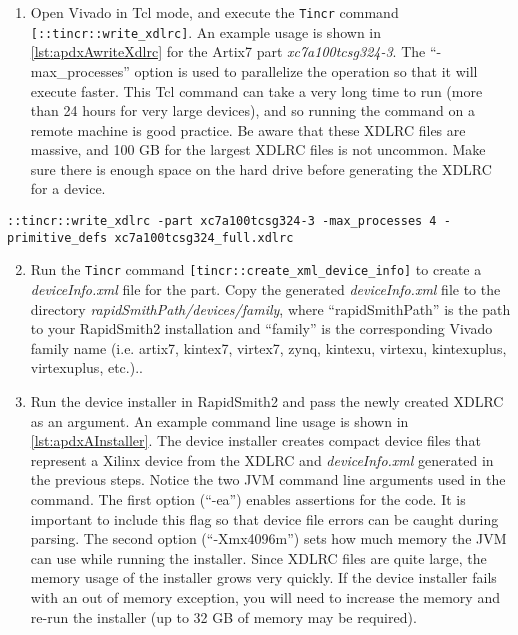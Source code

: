 \begin {enumerate}
\item Open Vivado in Tcl mode, and execute the \texttt{Tincr} command
\texttt{[::tincr::write\_xdlrc]}. An example usage is shown in
\autoref{lst:apdxAwriteXdlrc} for the Artix7 part \textit{xc7a100tcsg324-3}. The
``-max\_processes'' option is used to parallelize the operation so that it will
execute faster. This Tcl command can take a very long time to run (more than 24
hours for very large devices), and so running the command on a remote machine is
good practice. Be aware that these XDLRC files are massive, and 100 GB for the
largest XDLRC files is not uncommon. Make sure there is enough space on the
hard drive before generating the XDLRC for a device.

\end {enumerate}

\begin{lstlisting}[numbers=none, caption=XDLRC Generation Example, label=lst:apdxAwriteXdlrc] 
::tincr::write_xdlrc -part xc7a100tcsg324-3 -max_processes 4 -primitive_defs xc7a100tcsg324_full.xdlrc
\end{lstlisting}

\begin{enumerate}
\setcounter{enumi}{1} 
\item Run the \texttt{Tincr} command \texttt{[tincr::create\_xml\_device\_info]}
 to create a \textit{deviceInfo.xml} file for the part. Copy the generated
 \textit{deviceInfo.xml} file to the directory
 \textit{rapidSmithPath/devices/family}, where ``rapidSmithPath'' is the path to
 your RapidSmith2 installation and ``family'' is the corresponding Vivado
 family name (i.e. artix7, kintex7, virtex7, zynq, kintexu, virtexu,
 kintexuplus, virtexuplus, etc.)..

\item Run the device installer in RapidSmith2 and pass the newly created XDLRC
as an argument. An example command line usage is shown in
\autoref{lst:apdxAInstaller}. The device installer creates compact device files
that represent a Xilinx device from the XDLRC and \textit{deviceInfo.xml}
generated in the previous steps. Notice the two JVM command line arguments used
in the command. The first option (``-ea'') enables assertions for the code. It
is important to include this flag so that device file errors can be caught
during parsing. The second option (``-Xmx4096m'') sets how much memory the JVM
can use while running the installer. Since XDLRC files are quite large, the
memory usage of the installer grows very quickly. If the device installer fails
with an out of memory exception, you will need to increase the memory and
re-run the installer (up to 32 GB of memory may be required).
\end{enumerate}

